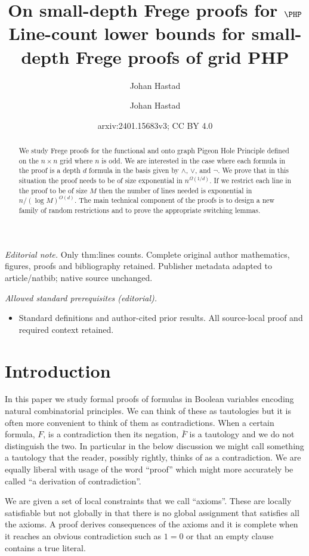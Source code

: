 \documentclass{article}\usepackage[a4paper,margin=20mm]{geometry}
\title{On small-depth Frege proofs for \texorpdfstring{$\PHP$}{PHP}}
\author{Johan Hastad}\date{}
\title{Line-count lower bounds for small-depth Frege proofs of grid PHP}
\author{Johan Hastad}
\date{arxiv:2401.15683v3; CC BY 4.0}
\begin{document}
\maketitle
\noindent\textit{Editorial note.} Only thm:lines counts. Complete original author mathematics, figures, proofs and bibliography retained. Publisher metadata adapted to article/natbib; native source unchanged.\par\medskip
\noindent\textit{Allowed standard prerequisites (editorial).}\begin{itemize}
\item Standard definitions and author-cited prior results. All source-local proof and required context retained.
\end{itemize}\medskip
\maketitle

\begin{abstract}
We study Frege proofs for the functional and onto
graph Pigeon Hole Principle
defined on the $n\times n$ grid where $n$ is odd.
We are interested in the case where each formula
in the proof is a depth $d$ formula in the basis given by
$\land$, $\lor$, and $\neg$.  We prove that in this situation the
proof needs to be of size exponential in $n^{\Omega (1/d)}$.
If we restrict each line in the proof to be of
size $M$ then the number of lines needed is exponential
in $n/(\log M)^{O(d)}$.   The main technical component of
the proofs is to design a new family of random restrictions
and to prove the appropriate switching lemmas.
\end{abstract}

\section{Introduction}
In this paper we study formal proofs of formulas in
Boolean variables encoding natural combinatorial principles.
We can think of these as tautologies but it is often
more convenient to think of them as contradictions.
When a certain formula, $F$, is a contradiction then its negation,
$\bar F$ is a tautology and we do not distinguish the two.
In particular in the below discussion we might call something
a tautology that the reader, possibly rightly, thinks of
as a contradiction.  We are equally liberal with usage
of the word ``proof'' which might more accurately be
called ``a derivation of contradiction''.  

We are given a set of local constraints that we call
``axioms''.  These are locally satisfiable but not globally in
that there is no global assignment that satisfies all the axioms.
A proof derives consequences
of the axioms and it is complete when it reaches 
an obvious contradiction such as $1=0$ or that an
empty clause contains a true literal.  
\end{document}
